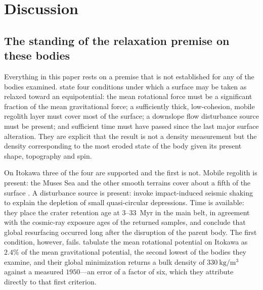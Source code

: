 \section{Discussion}
\label{sec:discussion}

\subsection{The standing of the relaxation premise on these bodies}
\label{sec:discussion:premise}

Everything in this paper rests on a premise that is not established for any
of the bodies examined. \citet{richardson2014} state four conditions under
which a surface may be taken as relaxed toward an equipotential: the mean
rotational force must be a significant fraction of the mean gravitational
force; a sufficiently thick, low-cohesion, mobile regolith layer must cover
most of the surface; a downslope flow disturbance source must be present;
and sufficient time must have passed since the last major surface
alteration. They are explicit that the result is not a density measurement
but the density corresponding to the most eroded state of the body given its
present shape, topography and spin.

On Itokawa three of the four are supported and the first is not. Mobile
regolith is present: the Muses Sea and the other smooth terrains cover about
a fifth of the surface \citep{fujiwara2006,kanamaru2019pss}. A disturbance
source is present: \citet{tatsumi2018} invoke impact-induced seismic shaking
to explain the depletion of small quasi-circular depressions. Time is
available: they place the crater retention age at $3$--$33$~Myr in the main
belt, in agreement with the cosmic-ray exposure ages of the returned
samples, and conclude that global resurfacing occurred long after the
disruption of the parent body. The first condition, however, fails.
\citet{richardson2014} tabulate the mean rotational potential on Itokawa as
$2.4\%$ of the mean gravitational potential, the second lowest of the bodies
they examine, and their global minimization returns a bulk density of
$\SI{330}{\kilo\gram\per\cubic\metre}$ against a measured $1950$---an error
of a factor of six, which they attribute directly to that first criterion.

